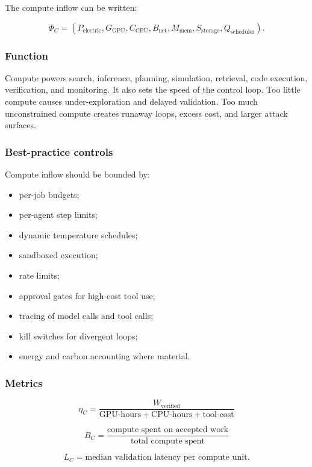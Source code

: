 The compute inflow can be written:

\[
\Phi_C=(P_{\text{electric}},G_{\text{GPU}},C_{\text{CPU}},B_{\text{net}},M_{\text{mem}},S_{\text{storage}},Q_{\text{scheduler}}).
\]

\subsubsection{Function}\label{function}

Compute powers search, inference, planning, simulation, retrieval, code
execution, verification, and monitoring. It also sets the speed of the
control loop. Too little compute causes under-exploration and delayed
validation. Too much unconstrained compute creates runaway loops, excess
cost, and larger attack surfaces.

\subsubsection{Best-practice controls}\label{best-practice-controls}

Compute inflow should be bounded by:

\begin{itemize}
\tightlist
\item
  per-job budgets;
\item
  per-agent step limits;
\item
  dynamic temperature schedules;
\item
  sandboxed execution;
\item
  rate limits;
\item
  approval gates for high-cost tool use;
\item
  tracing of model calls and tool calls;
\item
  kill switches for divergent loops;
\item
  energy and carbon accounting where material.
\end{itemize}

\subsubsection{Metrics}\label{metrics}

\[
\eta_C=\frac{W_{\text{verified}}}{\text{GPU-hours}+\text{CPU-hours}+\text{tool-cost}}
\]

\[
B_C=\frac{\text{compute spent on accepted work}}{\text{total compute spent}}
\]

\[
L_C=\text{median validation latency per compute unit}.
\]

